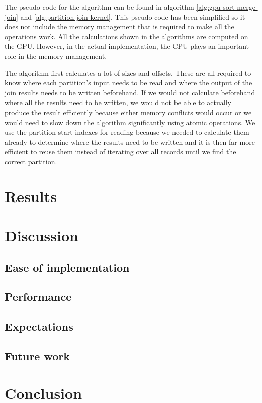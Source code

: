 \documentclass[a4paper,titlepage]{article}
\begin{document}
The pseudo code for the algorithm can be found in algorithm \ref{alg:gpu-sort-merge-join} and \ref{alg:partition-join-kernel}. This pseudo code has been simplified so it does not include the memory management that is required to make all the operations work. All the calculations shown in the algorithms are computed on the GPU. However, in the actual implementation, the CPU plays an important role in the memory management. 

The algorithm first calculates a lot of sizes and offsets. These are all required to know where each partition's input needs to be read and where the output of the join results needs to be written beforehand. If we would not calculate beforehand where all the results need to be written, we would not be able to actually produce the result efficiently because either memory conflicts would occur or we would need to slow down the algorithm significantly using atomic operations. We use the partition start indexes for reading because we needed to calculate them already to determine where the results need to be written and it is then far more efficient to reuse them instead of iterating over all records until we find the correct partition.

\section{Results}
\label{sec:results}

\section{Discussion}
\label{sec:discussion}

\subsection{Ease of implementation}

\subsection{Performance}

\subsection{Expectations}

\subsection{Future work}

\section{Conclusion}
\label{sec:conclusion}

{}

\end{document}
